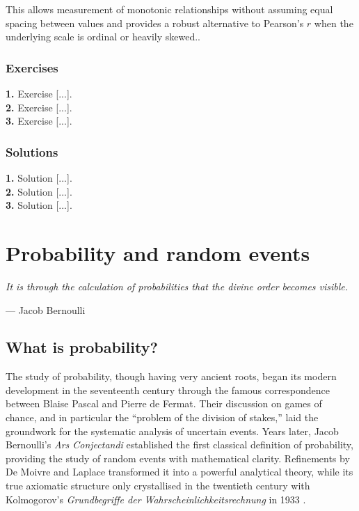 \documentclass{book}
\begin{document}
This allows measurement of monotonic relationships without assuming equal spacing between values and provides a robust alternative to Pearson's $r$ when the underlying scale is ordinal or heavily skewed..\\

\newpage

\subsection*{Exercises}

\textbf{1.} Exercise [...].\\

\textbf{2.} Exercise [...].\\

\textbf{3.} Exercise [...].\\

\newpage

\subsection*{Solutions}

\textbf{1.} Solution [...].\\

\textbf{2.} Solution [...].\\

\textbf{3.} Solution [...].\\



\chapter{Probability and random events}

\epigraph{\textit{It is through the calculation of probabilities that the divine order becomes visible.}}{— Jacob Bernoulli}

\section{What is probability?}

The study of probability, though having very ancient roots, began its modern development in the seventeenth century through the famous correspondence between Blaise Pascal and Pierre de Fermat. Their discussion on games of chance, and in particular the ``problem of the division of stakes,'' laid the groundwork for the systematic analysis of uncertain events. Years later, Jacob Bernoulli’s \textit{Ars Conjectandi} established the first classical definition of probability, providing the study of random events with mathematical clarity. Refinements by De Moivre and Laplace transformed it into a powerful analytical theory, while its true axiomatic structure only crystallised in the twentieth century with Kolmogorov’s \textit{Grundbegriffe der Wahrscheinlichkeitsrechnung} in 1933 \cite{kolmogorov1933}.
\medskip
\end{document}
